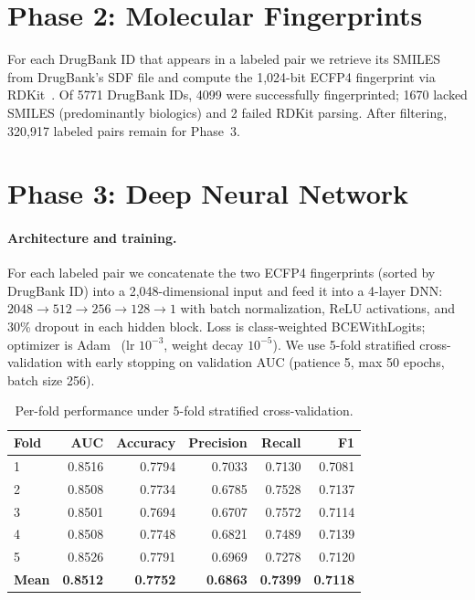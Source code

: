 \documentclass{article}
\begin{document}
\section{Phase 2: Molecular Fingerprints}\label{sec:phase2}
For each DrugBank ID that appears in a labeled pair we retrieve its SMILES from DrugBank's SDF file and compute the 1{,}024-bit ECFP4 fingerprint via RDKit~\cite{rogers2010ecfp}. Of 5771 DrugBank IDs, 4099 were successfully fingerprinted; 1670 lacked SMILES (predominantly biologics) and 2 failed RDKit parsing. After filtering, 320,917 labeled pairs remain for Phase~3.

\section{Phase 3: Deep Neural Network}\label{sec:phase3}

\paragraph{Architecture and training.} For each labeled pair we concatenate the two ECFP4 fingerprints (sorted by DrugBank ID) into a 2{,}048-dimensional input and feed it into a 4-layer DNN: $2048\!\to\!512\!\to\!256\!\to\!128\!\to\!1$ with batch normalization, ReLU activations, and 30\% dropout in each hidden block. Loss is class-weighted BCEWithLogits; optimizer is Adam~\cite{kingma2014adam} (lr $10^{-3}$, weight decay $10^{-5}$). We use 5-fold stratified cross-validation with early stopping on validation AUC (patience 5, max 50 epochs, batch size 256).

\begin{table}[H]
\centering
\caption{Per-fold performance under 5-fold stratified cross-validation.}
\label{tab:metrics}
\begin{tabular}{lrrrrr}
\toprule
Fold & AUC & Accuracy & Precision & Recall & F1 \\
\midrule
1 & 0.8516 & 0.7794 & 0.7033 & 0.7130 & 0.7081 \\
2 & 0.8508 & 0.7734 & 0.6785 & 0.7528 & 0.7137 \\
3 & 0.8501 & 0.7694 & 0.6707 & 0.7572 & 0.7114 \\
4 & 0.8508 & 0.7748 & 0.6821 & 0.7489 & 0.7139 \\
5 & 0.8526 & 0.7791 & 0.6969 & 0.7278 & 0.7120 \\
\midrule
\textbf{Mean} & \textbf{0.8512} & \textbf{0.7752} & \textbf{0.6863} & \textbf{0.7399} & \textbf{0.7118} \\
\bottomrule
\end{tabular}
\end{table}
\end{document}
